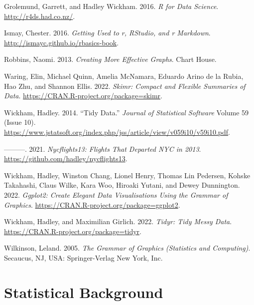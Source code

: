 \documentclass[
  letterpaper,
  DIV=11,
  numbers=noendperiod]{scrreprt}
\newlength{\cslhangindent}
\newlength{\cslentryspacingunit} %
\newenvironment{CSLReferences}[2] %
 {%
  \setlength{\parindent}{0pt}
  \ifodd #1
  \let\oldpar\par
  \def\par{\hangindent=\cslhangindent\oldpar}
  \fi
  \setlength{\parskip}{#2\cslentryspacingunit}
 }%
 {}
\theoremstyle{definition}
\theoremstyle{remark}
\begin{document}
\hypertarget{refs}{}
\begin{CSLReferences}{1}{0}
\leavevmode{}%
Grolemund, Garrett, and Hadley Wickham. 2016. \emph{R for Data Science}.
\url{http://r4ds.had.co.nz/}.

\leavevmode{}%
Ismay, Chester. 2016. \emph{Getting Used to r, {RStudio}, and r
Markdown}. \url{http://ismayc.github.io/rbasics-book}.

\leavevmode{}%
Robbins, Naomi. 2013. \emph{Creating More Effective Graphs}. Chart
House.

\leavevmode{}%
Waring, Elin, Michael Quinn, Amelia McNamara, Eduardo Arino de la Rubia,
Hao Zhu, and Shannon Ellis. 2022. \emph{Skimr: Compact and Flexible
Summaries of Data}. \url{https://CRAN.R-project.org/package=skimr}.

\leavevmode{}%
Wickham, Hadley. 2014. {``Tidy Data.''} \emph{Journal of Statistical
Software} Volume 59 (Issue 10).
\url{https://www.jstatsoft.org/index.php/jss/article/view/v059i10/v59i10.pdf}.

\leavevmode{}%
---------. 2021. \emph{Nycflights13: Flights That Departed NYC in 2013}.
\url{https://github.com/hadley/nycflights13}.

\leavevmode{}%
Wickham, Hadley, Winston Chang, Lionel Henry, Thomas Lin Pedersen,
Kohske Takahashi, Claus Wilke, Kara Woo, Hiroaki Yutani, and Dewey
Dunnington. 2022. \emph{Ggplot2: Create Elegant Data Visualisations
Using the Grammar of Graphics}.
\url{https://CRAN.R-project.org/package=ggplot2}.

\leavevmode{}%
Wickham, Hadley, and Maximilian Girlich. 2022. \emph{Tidyr: Tidy Messy
Data}. \url{https://CRAN.R-project.org/package=tidyr}.

\leavevmode{}%
Wilkinson, Leland. 2005. \emph{The Grammar of Graphics (Statistics and
Computing)}. Secaucus, NJ, USA: Springer-Verlag New York, Inc.

\end{CSLReferences}

\cleardoublepage
{}
{}
\appendix

\hypertarget{sec-stat-background}{%
\chapter{Statistical Background}\label{sec-stat-background}}
\end{document}
